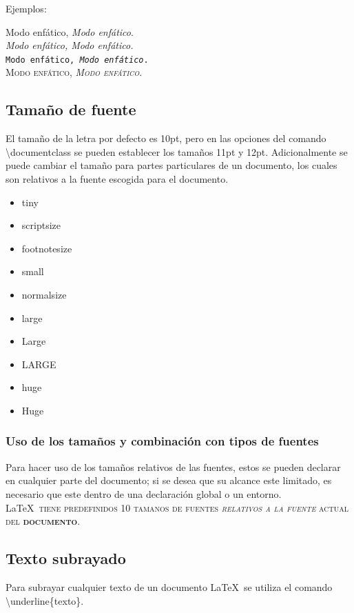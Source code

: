 \documentclass{article}
\begin{document}
Ejemplos: 

Modo enf\'atico, 
\emph{Modo enf\'atico}.\\ 
\textit{Modo enf\'atico, 
\emph{Modo enf\'atico}.}\\ 
\texttt{Modo enf\'atico, 
\emph{Modo enf\'atico}.}\\ 
\textsc{Modo enf\'atico, 
\emph{Modo enf\'atico}.}\\


\subsection{Tama\~no de fuente} 
El tama\~no de la letra por defecto es 10pt, pero en las opciones del comando 
\textbackslash documentclass se pueden establecer los tama\~nos 11pt y 12pt. 
Adicionalmente se puede cambiar el tama\~no para partes particulares de un 
documento, los cuales son relativos a la fuente escogida para el documento. 

\begin{itemize} 
\item{\tiny tiny} 
\item{\scriptsize scriptsize} 
\item{\footnotesize footnotesize} 
\item{\small small} 
\item{\normalsize normalsize} 
\item{\large large} 
\item{\Large Large} 
\item{\LARGE LARGE} 
\item{\huge huge} 
\item{\Huge Huge} 
\end{itemize} 


\subsubsection{Uso de los tama\~nos y combinaci\'on con tipos de fuentes} 
Para hacer uso de los tama\~nos relativos de las fuentes, estos se pueden declarar en cualquier parte del documento; si se desea que su alcance este limitado, es necesario que este dentro de una declaraci\'on global o un entorno.\\ 
{\small \LaTeX\ \textsc{tiene predefinidos {\tiny 10 tamanos} de fuentes \textit{\Large 
relativos a la fuente} actual del \textbf{\normalsize documento}.}} 

\subsection{Texto subrayado}
Para subrayar cualquier texto de un documento \LaTeX\
se utiliza el comando \textbackslash underline\{texto\}.
\end{document}
